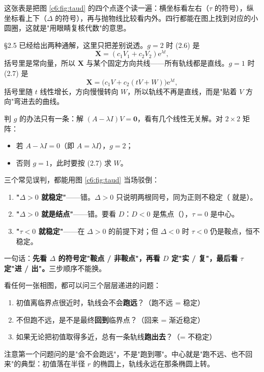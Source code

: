 \documentclass[11pt]{ctexart}
\newcommand{\X}{\mathbf{X}}\newcommand{\Y}{\mathbf{Y}}
\newcommand{\cnum}[1]{\ding{\the\numexpr171+#1\relax}}
\begin{document}
这张表是把图 \ref{c6:fig:taud} 的四个点逐个读一遍：横坐标看左右（$\tau$ 的符号），纵坐标看上下（$\Delta$ 的符号），再与抛物线比较看内外。四行都能在图上找到对应的小圆圈，这就是"用眼睛复核代数"的意思。


§2.5 已经给出两种通解，这里只把差别说透。$g=2$ 时 (2.6) 是
\[
\X=(c_1V_1+c_2V_2)\mathrm{e}^{\lambda t},
\]
括号里是常向量，所以 $\X$ 与某个固定方向共线——所有轨线都是直线。$g=1$ 时 (2.7) 是
\[
\X=\big(c_1V+c_2(tV+W)\big)\mathrm{e}^{\lambda t},
\]
括号里随 $t$ 线性增长，方向慢慢转向 $W$，所以轨线不再是直线，而是"贴着 $V$ 方向"弯进去的曲线。

判 $g$ 的办法只有一条：解 $(A-\lambda I)V=\mathbf{0}$，看有几个线性无关解。对 $2\times2$ 矩阵：
\begin{itemize}
\item 若 $A-\lambda I=0$（即 $A=\lambda I$），$g=2$；
\item 否则 $g=1$，此时要按 (2.7) 求 $W$。
\end{itemize}


三个常见误判，都能用图 \ref{c6:fig:taud} 当场驳倒：
\begin{enumerate}
\item \textbf{"$\Delta>0$ 就稳定"}——错。$\Delta>0$ 只说明两根同号，同为正则不稳定（\cnum{1}\cnum{4} 就是）。
\item \textbf{"$\Delta>0$ 就是结点"}——错。要看 $D$：$D<0$ 是焦点（\cnum{3}），$\tau=0$ 是中心。
\item \textbf{"$\tau<0$ 就稳定"}——在 $\Delta>0$ 的前提下对；但 $\Delta<0$ 时 $\tau<0$ 仍是鞍点，恒不稳定。
\end{enumerate}
一句话：\textbf{先看 $\Delta$ 的符号定"鞍点 / 非鞍点"，再看 $D$ 定"实 / 复"，最后看 $\tau$ 定"进 / 出"。}三步顺序不能换。



看任何一张相图，都可以问三个层层递进的问题：
\begin{enumerate}
\item 初值离临界点很近时，轨线会不会\textbf{跑远}？（跑不远 = 稳定）
\item 不但跑不远，是不是最终\textbf{回到}临界点？（回来 = 渐近稳定）
\item 如果无论把初值取得多近，总有一条轨线\textbf{跑出去}？（= 不稳定）
\end{enumerate}
注意第一个问题问的是"会不会跑远"，不是"跑到哪"。中心就是"跑不远、也不回来"的典型：初值落在半径 $r$ 的椭圆上，轨线永远在那条椭圆上转。
\end{document}
